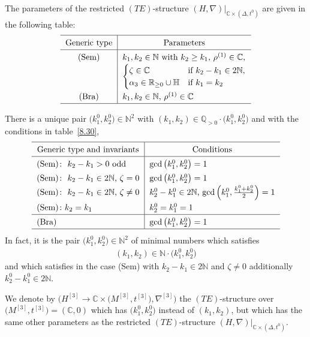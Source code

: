 \documentclass[10pt,a4paper]{amsart}
\numberwithin{equation}{section}
\numberwithin{figure}{section}
\newcommand{\N}{{\mathbb N}}
\newcommand{\Q}{{\mathbb Q}}
\newcommand{\C}{{\mathbb C}}
\newcommand{\R}{{\mathbb R}}
\renewcommand{\H}{{\mathbb H}}
\newcommand{\nnn}{\nabla}
\begin{document}
The parameters of the restricted $(TE)$-structure
$(H,\nnn)|_{\C\times(\Delta,t^0)}$ are given in the
following table:
\[
\def\arraystretch{1.4}
\begin{tabular}{c|l}
\hline
\multicolumn{1}{c|}{Generic type} & \multicolumn{1}{c}{Parameters}
\\ \hline
(Sem)& $k_1,k_2\in\N$ with $k_2\geq k_1$, $\rho^{(1)}\in\C$,
\\
& $\begin{cases}
 \zeta\in\C & \text{if}\ k_2-k_1\in 2\N,\\
 \alpha_3\in \R_{\geq 0}\cup\H & \text{if}\ k_1=k_2
 \end{cases}$
 \\
(Bra) & $k_1,k_2\in\N$, $\rho^{(1)}\in\C$
\\
\hline
\end{tabular}
\]

There is a unique pair $\big(k_1^0,k_2^0\big)\in\N^2$ with
$(k_1,k_2)\in\Q_{>0}\cdot \big(k_1^0,k_2^0\big)$ and with
the conditions in table~\eqref{8.30},
\begin{gather}\label{8.30}
\def\arraystretch{1.4}
\begin{tabular}{l|l}
\hline
\multicolumn{1}{c|}{Generic type and invariants} & \multicolumn{1}{c}{Conditions}
\\ \hline
(Sem$)\colon\ k_2-k_1>0$ odd& $\gcd\big(k^0_1,k^0_2\big)=1$
\\
(Sem$)\colon\ k_2-k_1\in 2\N$, $\zeta= 0$ & $\gcd\big(k^0_1,k^0_2\big)=1$
\\
(Sem$)\colon\ k_2-k_1\in 2\N$, $\zeta\neq 0$ &$k^0_2-k^0_1\in 2\N$, $\gcd\left(k^0_1,\frac{k_1^0+k^0_2}{2}\right)=1$
\\
(Sem$)\colon k_2=k_1$ & $k^0_2=k^0_1=1$
\\
\hline
(Bra) & $\gcd\big(k^0_1,k^0_2\big)=1$
\\
\hline
\end{tabular}
\end{gather}
In fact, it is the pair $\big(k_1^0,k_2^0\big)\in\N^2$
of minimal numbers which satisfies{\samepage
\begin{gather*}%
(k_1,k_2)\in \N\cdot \big(k_1^0,k_2^0\big)
\end{gather*}
and which satisfies in the case (Sem) with $k_2-k_1\in 2\N$
and $\zeta\neq 0$ additionally $k_2^0-k_1^0\in 2\N$.}

We denote by $\big(H^{[3]}\to\C\times \big(M^{[3]},t^{[3]}\big),\nnn^{[3]}\big)$
the $(TE)$-structure over $\big(M^{[3]},t^{[3]}\big)=(\C,0)$
which has $\big(k_1^0,k_2^0\big)$ instead of $(k_1,k_2)$,
but which has the same other parameters as the restricted
$(TE)$-structure $(H,\nnn)|_{\C\times(\Delta,t^0)}$.
\end{document}
